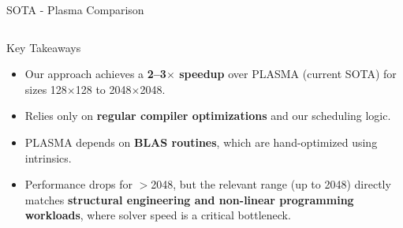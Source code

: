 \begin{frame}{SOTA - Plasma Comparison}
\begin{columns}[c,onlytextwidth]
		\pause
		\begin{block}{Key Takeaways}
		  \begin{itemize}
			 \item Our approach achieves a \textbf{2--3$\times$ speedup} over PLASMA (current SOTA)
			       for sizes 128$\times$128 to 2048$\times$2048.  
			 \item Relies only on \textbf{regular compiler optimizations} and our scheduling logic.  
			 \item PLASMA depends on \textbf{BLAS routines}, which are hand-optimized using intrinsics.  
			 \item Performance drops for $>$2048, but the relevant range (up to 2048) 
			  directly matches \textbf{structural engineering and non-linear programming workloads}, 
			  where solver speed is a critical bottleneck.	
		  \end{itemize}
		\end{block}
	
	\end{columns}
\end{frame}
